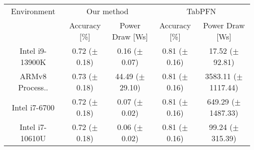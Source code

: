 
    \begin{tabular}{c|cc|cc}
        \toprule 
        Environment & \multicolumn{2}{c}{Our method} & \multicolumn{2}{c}{TabPFN} \\
        & Accuracy [\%] & Power Draw [Ws] & Accuracy [\%] & Power Draw [Ws] \\
        \midrule
        Intel i9-13900K &  0.72 ($\pm$ 0.18) &  0.16 ($\pm$ 0.07) &  0.81 ($\pm$ 0.16) & 17.52 ($\pm$92.81) \\
        ARMv8 Process.. &  0.73 ($\pm$ 0.18) & 44.49 ($\pm$29.10) &  0.81 ($\pm$ 0.16) & 3583.11 ($\pm$1117.44) \\
        Intel i7-6700 &  0.72 ($\pm$ 0.18) &  0.07 ($\pm$ 0.02) &  0.81 ($\pm$ 0.16) & 649.29 ($\pm$1487.33) \\
        Intel i7-10610U &  0.72 ($\pm$ 0.18) &  0.06 ($\pm$ 0.02) &  0.81 ($\pm$ 0.16) & 99.24 ($\pm$315.39) \\
        \bottomrule
    \end{tabular}
